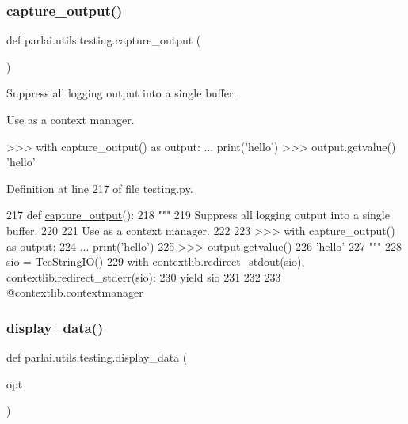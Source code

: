 \subsubsection{\texorpdfstring{capture\+\_\+output()}{capture\_output()}}
{\footnotesize\ttfamily def parlai.\+utils.\+testing.\+capture\+\_\+output (\begin{DoxyParamCaption}{ }\end{DoxyParamCaption})}

\begin{DoxyVerb}Suppress all logging output into a single buffer.

Use as a context manager.

>>> with capture_output() as output:
...     print('hello')
>>> output.getvalue()
'hello'
\end{DoxyVerb}
 

Definition at line 217 of file testing.\+py.


\begin{DoxyCode}
217 \textcolor{keyword}{def }\hyperlink{namespaceparlai_1_1utils_1_1testing_ab00d4d693202afab92c06387aa50699b}{capture\_output}():
218     \textcolor{stringliteral}{"""}
219 \textcolor{stringliteral}{    Suppress all logging output into a single buffer.}
220 \textcolor{stringliteral}{}
221 \textcolor{stringliteral}{    Use as a context manager.}
222 \textcolor{stringliteral}{}
223 \textcolor{stringliteral}{    >>> with capture\_output() as output:}
224 \textcolor{stringliteral}{    ...     print('hello')}
225 \textcolor{stringliteral}{    >>> output.getvalue()}
226 \textcolor{stringliteral}{    'hello'}
227 \textcolor{stringliteral}{    """}
228     sio = TeeStringIO()
229     with contextlib.redirect\_stdout(sio), contextlib.redirect\_stderr(sio):
230         \textcolor{keywordflow}{yield} sio
231 
232 
233 @contextlib.contextmanager
\end{DoxyCode}
\mbox{\label{namespaceparlai_1_1utils_1_1testing_a30c532f112f9beddd873382e649b3ecd}} 
\subsubsection{\texorpdfstring{display\+\_\+data()}{display\_data()}}
{\footnotesize\ttfamily def parlai.\+utils.\+testing.\+display\+\_\+data (\begin{DoxyParamCaption}\item[{}]{opt }\end{DoxyParamCaption})}

